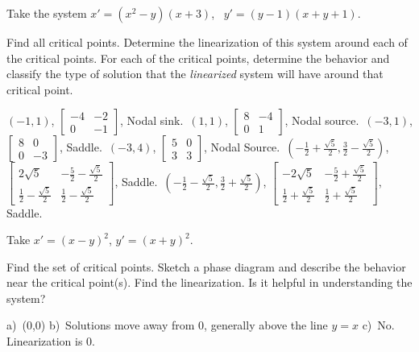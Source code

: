 \begin{exercise}
Take the system $x' = (x^2 - y)(x+3)$, \ $y' = (y-1)(x+y+1)$.
\begin{tasks}
\task Find all critical points.
\task Determine the linearization of this system around each of the critical points.
\task For each of the critical points, determine the behavior and classify the type of solution that the \emph{linearized} system will have around that critical point. 
\end{tasks}
\end{exercise}
\comboSol{%
}
{%
$(-1,1)$, $\left[\begin{smallmatrix} -4 & -2 \\ 0 & -1 \end{smallmatrix}\right]$, Nodal sink.\ $(1,1)$, $\left[\begin{smallmatrix} 8 & -4 \\ 0 & 1 \end{smallmatrix}\right]$, Nodal source.\ 
$(-3, 1)$, $\left[\begin{smallmatrix} 8 & 0 \\ 0 & -3 \end{smallmatrix}\right]$, Saddle.\ 
$(-3, 4)$, $\left[\begin{smallmatrix} 5 & 0 \\ 3 & 3 \end{smallmatrix}\right]$, Nodal Source.\ 
$\left( -\frac{1}{2} + \frac{\sqrt{5}}{2}, \frac{3}{2} - \frac{\sqrt{5}}{2}\right)$, $\left[\begin{smallmatrix} 2\sqrt{5} & -\frac{5}{2} - \frac{\sqrt{5}}{2} \\ \frac{1}{2} - \frac{\sqrt{5}}{2} & \frac{1}{2} - \frac{\sqrt{5}}{2} \end{smallmatrix}\right]$, Saddle.\ 
$\left( -\frac{1}{2} - \frac{\sqrt{5}}{2}, \frac{3}{2} + \frac{\sqrt{5}}{2}\right)$, $\left[\begin{smallmatrix} -2\sqrt{5} & -\frac{5}{2} + \frac{\sqrt{5}}{2} \\ \frac{1}{2} + \frac{\sqrt{5}}{2} & \frac{1}{2} + \frac{\sqrt{5}}{2} \end{smallmatrix}\right]$, Saddle.
}

\begin{exercise}
Take $x'=(x-y)^2$, \enspace $y'=(x+y)^2$. 
\begin{tasks}
\task Find the set of critical points.
\task Sketch a phase diagram and describe the behavior near the critical
point(s).
\task Find the linearization.  Is it helpful in understanding the system?
\end{tasks}
\end{exercise}
\comboSol{%
}
{%
a)~(0,0) \quad b)~Solutions move away from 0, generally above the line $y=x$ \quad c)~No. Linearization is 0.
}


